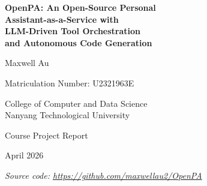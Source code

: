 \documentclass[12pt,a4paper]{article}
\begin{document}
\begin{titlepage}
  \centering
  \vspace*{2cm}
  {\Huge\bfseries OpenPA: An Open-Source Personal\\Assistant-as-a-Service with\\LLM-Driven Tool Orchestration\\and Autonomous Code Generation\par}
  \vspace{1.5cm}
  {\Large Maxwell Au\par}
  \vspace{0.3cm}
  {\large Matriculation Number: U2321963E\par}
  \vspace{0.5cm}
  {\large College of Computer and Data Science\\Nanyang Technological University\par}
  \vspace{1cm}
  {\large Course Project Report\par}
  \vspace{0.5cm}
  {\large April 2026\par}
  \vfill
  {\normalsize\textit{Source code: \url{https://github.com/maxwellau2/OpenPA}}\par}
\end{titlepage}

\newpage
\tableofcontents
\newpage










\newpage
\printbibliography[title={References}]
\end{document}
